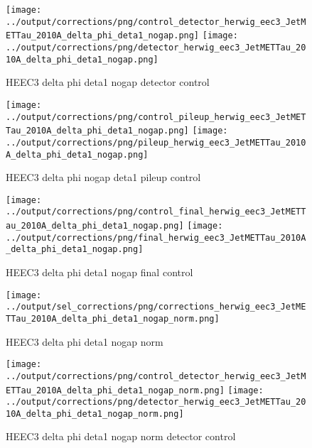 \documentclass[11pt]{book}
\begin{document}
\begin{figure}[ht]
\centering
\texttt{[image: ../output/corrections/png/control\_detector\_herwig\_eec3\_JetMETTau\_2010A\_delta\_phi\_deta1\_nogap.png]}
\texttt{[image: ../output/corrections/png/detector\_herwig\_eec3\_JetMETTau\_2010A\_delta\_phi\_deta1\_nogap.png]}
\caption{HEEC3 delta phi deta1 nogap detector control}
\label{fig:HEEC3_JetMETTau_2010A_delta_phi_deta1_nogap_detector_control}
\end{figure}

\begin{figure}[ht]
\centering
\texttt{[image: ../output/corrections/png/control\_pileup\_herwig\_eec3\_JetMETTau\_2010A\_delta\_phi\_deta1\_nogap.png]}
\texttt{[image: ../output/corrections/png/pileup\_herwig\_eec3\_JetMETTau\_2010A\_delta\_phi\_deta1\_nogap.png]}
\caption{HEEC3 delta phi nogap deta1 pileup control}
\label{fig:HEEC3_JetMETTau_2010A_delta_phi_deta1_nogap_pileup_control}
\end{figure}


\begin{figure}[ht]
\centering
\texttt{[image: ../output/corrections/png/control\_final\_herwig\_eec3\_JetMETTau\_2010A\_delta\_phi\_deta1\_nogap.png]}
\texttt{[image: ../output/corrections/png/final\_herwig\_eec3\_JetMETTau\_2010A\_delta\_phi\_deta1\_nogap.png]}
\caption{HEEC3 delta phi deta1 nogap final control}
\label{fig:HEEC3_JetMETTau_2010A_delta_phi_deta1_nogap_final_control}
\end{figure}

\begin{figure}[ht]
\centering
\texttt{[image: ../output/sel\_corrections/png/corrections\_herwig\_eec3\_JetMETTau\_2010A\_delta\_phi\_deta1\_nogap\_norm.png]}
\caption{HEEC3 delta phi deta1 nogap norm}
\label{fig:HEEC3_JetMETTau_2010A_delta_phi_deta1_nogap_norm}
\end{figure}

\begin{figure}[ht]
\centering
\texttt{[image: ../output/corrections/png/control\_detector\_herwig\_eec3\_JetMETTau\_2010A\_delta\_phi\_deta1\_nogap\_norm.png]}
\texttt{[image: ../output/corrections/png/detector\_herwig\_eec3\_JetMETTau\_2010A\_delta\_phi\_deta1\_nogap\_norm.png]}
\caption{HEEC3 delta phi deta1 nogap norm detector control}
\label{fig:HEEC3_JetMETTau_2010A_delta_phi_deta1_nogap_norm_detector_control}
\end{figure}
\end{document}
